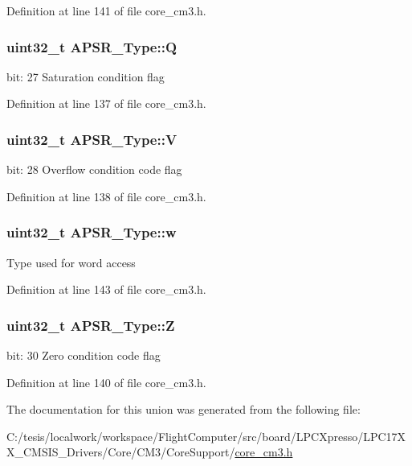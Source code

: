 \-Definition at line 141 of file core\-\_\-cm3.\-h.

\hypertarget{union_a_p_s_r___type_a22d10913489d24ab08bd83457daa88de}{
\subsubsection[{\-Q}]{\setlength{\rightskip}{0pt plus 5cm}uint32\-\_\-t {\bf \-A\-P\-S\-R\-\_\-\-Type\-::\-Q}}}\label{union_a_p_s_r___type_a22d10913489d24ab08bd83457daa88de}
bit\-: 27 \-Saturation condition flag 

\-Definition at line 137 of file core\-\_\-cm3.\-h.

\hypertarget{union_a_p_s_r___type_a8004d224aacb78ca37774c35f9156e7e}{
\subsubsection[{\-V}]{\setlength{\rightskip}{0pt plus 5cm}uint32\-\_\-t {\bf \-A\-P\-S\-R\-\_\-\-Type\-::\-V}}}\label{union_a_p_s_r___type_a8004d224aacb78ca37774c35f9156e7e}
bit\-: 28 \-Overflow condition code flag 

\-Definition at line 138 of file core\-\_\-cm3.\-h.

\hypertarget{union_a_p_s_r___type_ae4c2ef8c9430d7b7bef5cbfbbaed3a94}{
\subsubsection[{w}]{\setlength{\rightskip}{0pt plus 5cm}uint32\-\_\-t {\bf \-A\-P\-S\-R\-\_\-\-Type\-::w}}}\label{union_a_p_s_r___type_ae4c2ef8c9430d7b7bef5cbfbbaed3a94}
\-Type used for word access 

\-Definition at line 143 of file core\-\_\-cm3.\-h.

\hypertarget{union_a_p_s_r___type_a3b04d58738b66a28ff13f23d8b0ba7e5}{
\subsubsection[{\-Z}]{\setlength{\rightskip}{0pt plus 5cm}uint32\-\_\-t {\bf \-A\-P\-S\-R\-\_\-\-Type\-::\-Z}}}\label{union_a_p_s_r___type_a3b04d58738b66a28ff13f23d8b0ba7e5}
bit\-: 30 \-Zero condition code flag 

\-Definition at line 140 of file core\-\_\-cm3.\-h.



\-The documentation for this union was generated from the following file\-:\begin{DoxyCompactItemize}
\item 
\-C\-:/tesis/localwork/workspace/\-Flight\-Computer/src/board/\-L\-P\-C\-Xpresso/\-L\-P\-C17\-X\-X\-\_\-\-C\-M\-S\-I\-S\-\_\-\-Drivers/\-Core/\-C\-M3/\-Core\-Support/\hyperlink{core__cm3_8h}{core\-\_\-cm3.\-h}\end{DoxyCompactItemize}
